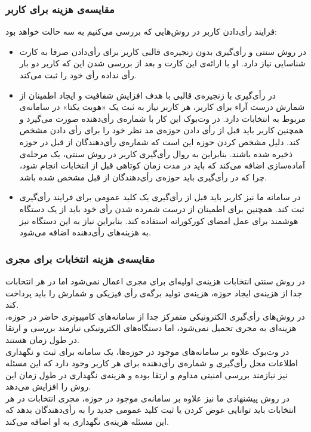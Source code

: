 \subsubsection{مقایسه‌ی هزینه برای کاربر}
فرایند رأی‌دادن کاربر در روش‌هایی که بررسی می‌کنیم به سه حالت خواهد بود:
\begin{itemize}
 \item 
 در روش‌ سنتی و رأی‌گیری بدون زنجیره‌ی قالبی کاربر برای رأی‌دادن صرفا به کارت شناسایی نیاز دارد. او با ارائه‌ی این کارت و بعد از بررسی شدن این که کاربر دو بار رأی نداده رأی خود را ثبت می‌کند. 
 \item 
 در رأی‌گیری با زنجیره‌ی قالبی با هدف افزایش شفافیت و ایجاد اطمینان از شمارش درست آراء برای کاربر، هر کاربر نیاز به ثبت یک «هویت یکتا» در سامانه‌ی مربوط به انتخابات دارد. در وت‌بوک این کار با شماره‌ی رأی‌‌دهنده صورت می‌گیرد و همچنین کاربر باید قبل از رأی‌ دادن حوزه‌ی مد نظر خود را برای رأی ‌دادن مشخص کند. دلیل مشخص کردن حوزه این است که شماره‌ی رأی‌دهندگان از قبل در حوزه ذخیره شده باشند. بنابراین به روال رأی‌گیری کاربر در روش سنتی، یک مرحله‌ی آماده‌سازی اضافه می‌کند که باید در مدت زمان کوتاهی قبل از انتخابات انجام شود، چرا که در رأی‌گیری باید حوزه‌ی رأی‌دهندگان از قبل مشخص شده باشد.
 
 \item
 در سامانه ما نیز کاربر باید قبل از رأی‌گیری یک کلید عمومی برای فرایند رأی‌گیری ثبت کند. همچنین برای اطمینان از درست شمرده شدن رأی خود باید از یک دستگاه هوشمند برای عمل امضای کورکورانه استفاده کند. بنابراین نیاز به این دستگاه نیز به هزینه‌های رأی‌دهنده اضافه می‌شود. 
\end{itemize}
\subsubsection{مقایسه‌ی هزینه انتخابات برای مجری}
در روش سنتی انتخابات هزینه‌ی اولیه‌ای برای مجری اعمال نمی‌شود اما در هر انتخابات جدا از هزینه‌ی ایجاد حوزه، هزینه‌ی تولید برگه‌ی رأی فیزیکی و شمارش را باید پرداخت کند. 
\\
در روش‌های رأی‌گیری الکترونیکی متمرکز جدا از سامانه‌های کامپیوتری حاضر در حوزه، هزینه‌‌ای به مجری تحمیل نمی‌شود، اما دستگا‌ه‌های الکترونیکی نیازمند بررسی و ارتقا در طول زمان هستند.
\\
در وت‌بوک علاوه بر سامانه‌های موجود در حوزه‌ها، یک سامانه‌ برای ثبت و نگهداری اطلاعات محل رأی‌گیری و شماره‌ی رأی‌دهنده برای هر کاربر وجود دارد که این مسئله نیز نیازمند بررسی امنیتی مداوم و ارتقا بوده و هزینه‌ی نگهداری در طول زمان این روش را افزایش می‌دهد. 
\\
در روش پیشنهادی ما نیز علاوه بر سامانه‌ی موجود در حوزه، مجری انتخابات در هر انتخابات باید توانایی عوض کردن یا ثبت کلید عمومی جدید را به رأی‌دهندگان بدهد که این مسئله هزینه‌ی نگهداری به او اضافه می‌کند. 
